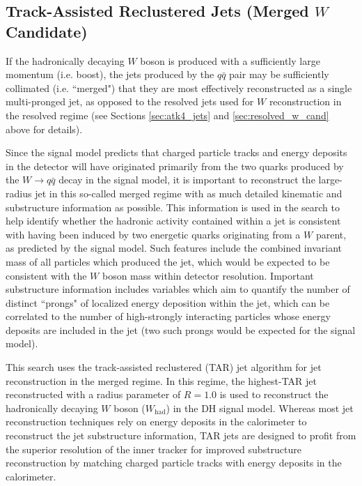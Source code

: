 \subsection{Track-Assisted Reclustered Jets (Merged \(W\) Candidate)}
\label{sec:TAR_jets}

If the hadronically decaying \(W\) boson is produced with a sufficiently large momentum (i.e. boost), the jets produced by the \(q\bar{q}\) pair may be sufficiently collimated (i.e. ``merged") that they are most effectively reconstructed as a single multi-pronged \largeR jet, as opposed to the resolved \smallR jets used for \(W\) reconstruction in the resolved regime (see Sections \ref{sec:atk4_jets} and \ref{sec:resolved_w_cand} above for details). 

Since the signal model predicts that charged particle tracks and energy deposits in the detector will have originated primarily from the two quarks produced by the \(W\rightarrow q\bar{q}\) decay in the signal model, it is important to reconstruct the large-radius jet in this so-called merged regime with as much detailed kinematic and substructure information as possible. This information is used in the search to help identify whether the hadronic activity contained within a \largeR jet is consistent with having been induced by two energetic quarks originating from a \(W\) parent, as predicted by the signal model. Such features include the combined invariant mass \mTAR of all particles which produced the jet, which would be expected to be consistent with the \(W\) boson mass within detector resolution. Important substructure information includes variables which aim to quantify the number of distinct ``prongs" of localized energy deposition within the jet, which can be correlated to the number of high-\pt strongly interacting particles whose energy deposits are included in the jet (two such prongs would be expected for the signal model). 

This search uses the track-assisted reclustered (TAR) jet algorithm \cite{ATL-PHYS-PUB-2018-012} for \largeR jet reconstruction in the merged regime. In this regime, the highest-\pt TAR jet reconstructed with a radius parameter of \(R=1.0\) is used to reconstruct the hadronically decaying \(W\) boson (\(W_\text{had}\)) in the DH signal model. Whereas most \largeR jet reconstruction techniques rely on energy deposits in the calorimeter to reconstruct the jet substructure information, TAR jets are designed to profit from the superior resolution of the inner tracker for improved substructure reconstruction by matching charged particle tracks with energy deposits in the calorimeter. 

